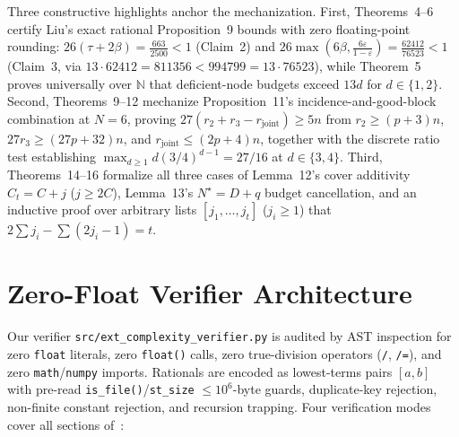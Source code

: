 \documentclass[10pt,twocolumn]{article}
\begin{document}
Three constructive highlights anchor the mechanization. First, Theorems~4--6 certify Liu's exact rational Proposition~9 bounds with zero floating-point rounding: $26(\tau+2\beta) = \tfrac{663}{2500} < 1$ (Claim~2) and $26\max(6\beta, \tfrac{6\varepsilon}{1-\varepsilon}) = \tfrac{62412}{76523} < 1$ (Claim~3, via $13\cdot 62412 = 811356 < 994799 = 13\cdot 76523$), while Theorem~5 proves universally over $\mathbb{N}$ that deficient-node budgets exceed $13d$ for $d\in\{1,2\}$. Second, Theorems~9--12 mechanize Proposition~11's incidence-and-good-block combination at $N=6$, proving $27(r_2+r_3-r_{\mathrm{joint}}) \ge 5n$ from $r_2 \ge (p+3)n$, $27r_3 \ge (27p+32)n$, and $r_{\mathrm{joint}} \le (2p+4)n$, together with the discrete ratio test establishing $\max_{d\ge 1} d(3/4)^{d-1} = 27/16$ at $d\in\{3,4\}$. Third, Theorems~14--16 formalize all three cases of Lemma~12's cover additivity $C_t = C + j$ ($j \ge 2C$), Lemma~13's $N^\star = D+q$ budget cancellation, and an inductive proof over arbitrary lists $[j_1,\dots,j_t]$ ($j_i \ge 1$) that $2\sum j_i - \sum(2j_i-1) = t$.

\section{Zero-Float Verifier Architecture}
Our verifier \nolinkurl{src/ext_complexity_verifier.py} is audited by AST inspection for zero \texttt{float} literals, zero \texttt{float()} calls, zero true-division operators (\texttt{/}, \texttt{/=}), and zero \texttt{math}/\texttt{numpy} imports. Rationals are encoded as lowest-terms pairs $[a,b]$ with pre-read \texttt{is\_file()}/\texttt{st\_size} $\le 10^6$-byte guards, duplicate-key rejection, non-finite constant rejection, and recursion trapping. Four verification modes cover all sections of~\cite{Liu2026ExtensionComplexity}:
\end{document}
